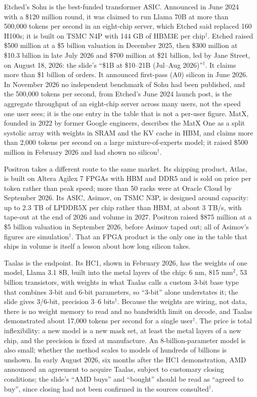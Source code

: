 \documentclass[11pt,letterpaper]{article}
\begin{document}
Etched's Sohu is the best-funded transformer ASIC. Announced in June 2024 with a \$120 million round, it was claimed to run Llama 70B at more than 500{,}000 tokens per second in an eight-chip server, which Etched said replaced 160 H100s; it is built on TSMC N4P with 144 GB of HBM3E per chip$^\dagger$. Etched raised \$500 million at a \$5 billion valuation in December 2025, then \$300 million at \$10.3 billion in late July 2026 and \$700 million at \$21 billion, led by Jane Street, on August 18, 2026: the slide's ``\$1B at \$10--21B (Jul--Aug 2026)''$^\dagger$. It claims more than \$1 billion of orders. It announced first-pass (A0) silicon in June 2026. In November 2026 no independent benchmark of Sohu had been published, and the 500{,}000 tokens per second, from Etched's June 2024 launch post, is the aggregate throughput of an eight-chip server across many users, not the speed one user sees; it is the one entry in the table that is not a per-user figure. MatX, founded in 2022 by former Google engineers, describes the MatX One as a split systolic array with weights in SRAM and the KV cache in HBM, and claims more than 2{,}000 tokens per second on a large mixture-of-experts model; it raised \$500 million in February 2026 and had shown no silicon$^\dagger$.

Positron takes a different route to the same market. Its shipping product, Atlas, is built on Altera Agilex 7 FPGAs with HBM and DDR5 and is sold on price per token rather than peak speed; more than 50 racks were at Oracle Cloud by September 2026. Its ASIC, Asimov, on TSMC N3P, is designed around capacity: up to 2.3 TB of LPDDR5X per chip rather than HBM, at about 3 TB/s, with tape-out at the end of 2026 and volume in 2027. Positron raised \$875 million at a \$5 billion valuation in September 2026, before Asimov taped out; all of Asimov's figures are simulation$^\dagger$. That an FPGA product is the only one in the table that ships in volume is itself a lesson about how long silicon takes.

Taalas is the endpoint. Its HC1, shown in February 2026, has the weights of one model, Llama 3.1 8B, built into the metal layers of the chip: 6 nm, 815 mm$^2$, 53 billion transistors, with weights in what Taalas calls a custom 3-bit base type that combines 3-bit and 6-bit parameters, so ``3-bit'' alone understates it; the slide gives 3/6-bit, precision 3--6 bits$^\dagger$. Because the weights are wiring, not data, there is no weight memory to read and no bandwidth limit on decode, and Taalas demonstrated about 17{,}000 tokens per second for a single user$^\dagger$. The price is total inflexibility: a new model is a new mask set, at least the metal layers of a new chip, and the precision is fixed at manufacture. An 8-billion-parameter model is also small; whether the method scales to models of hundreds of billions is unshown. In early August 2026, six months after the HC1 demonstration, AMD announced an agreement to acquire Taalas, subject to customary closing conditions; the slide's ``AMD buys'' and ``bought'' should be read as ``agreed to buy'', since closing had not been confirmed in the sources consulted$^\dagger$.
\end{document}
